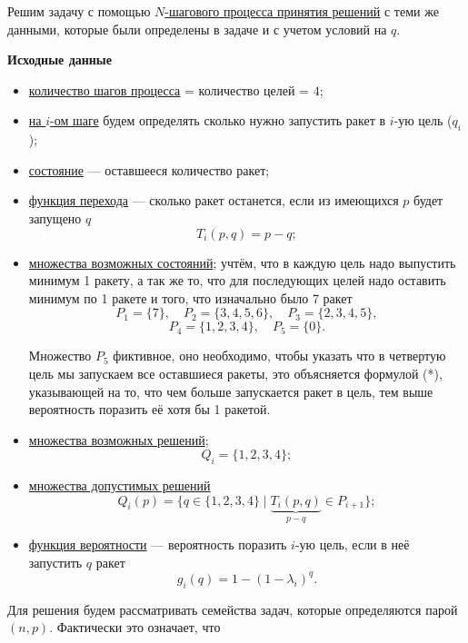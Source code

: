 \solution

Решим задачу с помощью \hyperref[alg:n_step_process]{$N$-шагового процесса принятия решений} с теми же данными, которые были определены в задаче и с учетом условий на $q$.

\bigskip

\textbf{Исходные данные}
\begin{itemize}[nosep]
	\item \underline{количество шагов процесса} = количество целей = $4$;
	
	\item \underline{на $i$-ом шаге} будем определять сколько нужно запустить ракет в $i$-ую цель ($q_i$);
	
	\item \underline{состояние} --- оставшееся количество ракет;
	
	\item \underline{функция перехода} --- сколько ракет останется, если из имеющихся $p$ будет запущено $q$
	\[T_i(p, q) = p - q;\]
	
	\item \underline{множества возможных состояний}; учтём, что в каждую цель надо выпустить минимум 1 ракету, а так же то, что для последующих целей надо оставить минимум по 1 ракете и того, что изначально было 7 ракет
	\[
	P_1 = \{7\}, \quad P_2 = \{3, 4, 5, 6\}, \quad P_3 = \{2, 3, 4, 5\},
	\]
	\[
	P_4 = \{1, 2, 3, 4\}, \quad P_5 = \{0\}.
	\]
	
	Множество $P_5$ фиктивное, оно необходимо, чтобы указать что в четвертую цель мы запускаем все оставшиеся ракеты, это объясняется формулой (*), указывающей на то, что чем больше запускается ракет в цель, тем выше вероятность поразить её хотя бы 1 ракетой.
	
	\item \underline{множества возможных решений};
	\[Q_i = \{1, 2, 3, 4\};\]
	
	\item \underline{множества допустимых решений}
	\[Q_i(p) = \{q \in \{1, 2, 3, 4\} \; \big| \; \underbrace{T_i(p, q)}_{p - q} \in P_{i + 1} \};\]
	
	\item \underline{функция вероятности} --- вероятность поразить $i$-ую цель, если в неё запустить $q$ ракет
	\[g_i(q) = 1 - (1 - \lambda_i)^{q}.\]
\end{itemize}

Для решения будем рассматривать семейства задач, которые определяются парой $(n, p)$. Фактически это означает, что

